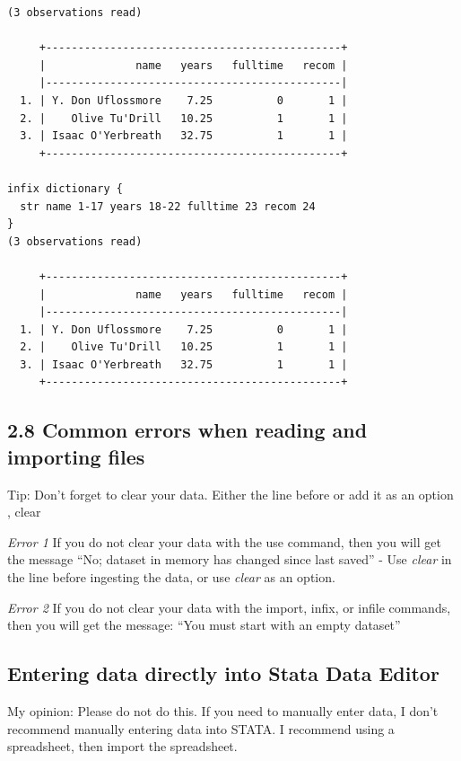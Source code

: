 \documentclass[
]{book}
\begin{document}
\begin{verbatim}
(3 observations read)

     +----------------------------------------------+
     |              name   years   fulltime   recom |
     |----------------------------------------------|
  1. | Y. Don Uflossmore    7.25          0       1 |
  2. |    Olive Tu'Drill   10.25          1       1 |
  3. | Isaac O'Yerbreath   32.75          1       1 |
     +----------------------------------------------+

infix dictionary {
  str name 1-17 years 18-22 fulltime 23 recom 24
}
(3 observations read)

     +----------------------------------------------+
     |              name   years   fulltime   recom |
     |----------------------------------------------|
  1. | Y. Don Uflossmore    7.25          0       1 |
  2. |    Olive Tu'Drill   10.25          1       1 |
  3. | Isaac O'Yerbreath   32.75          1       1 |
     +----------------------------------------------+
\end{verbatim}

\subsection{2.8 Common errors when reading and importing files}\label{common-errors-when-reading-and-importing-files}

Tip: Don't forget to clear your data.
Either the line before or add it as an option , clear

\emph{Error 1}
If you do not clear your data with the use command, then you will get the message ``No; dataset in memory has changed since last saved'' - Use \emph{clear} in the line before ingesting the data, or use \emph{clear} as an option.

\emph{Error 2}
If you do not clear your data with the import, infix, or infile commands, then you will get the message:
``You must start with an empty dataset''

\subsection{Entering data directly into Stata Data Editor}\label{entering-data-directly-into-stata-data-editor}

My opinion: Please do not do this. If you need to manually enter data, I don't recommend manually entering data into STATA. I recommend using a spreadsheet, then import the
spreadsheet.
\end{document}

